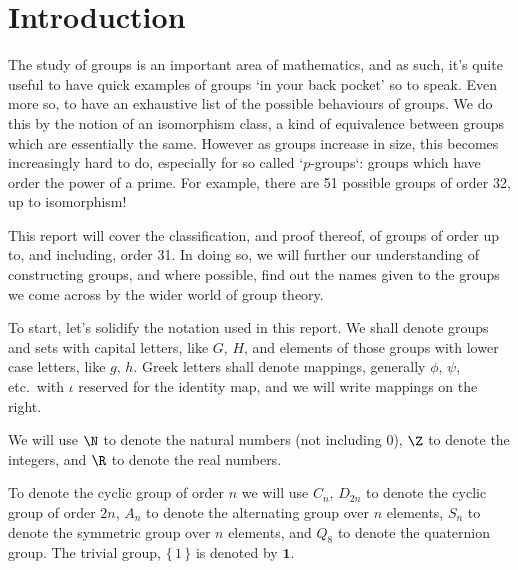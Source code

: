 \section{Introduction}
The study of groups is an important area of mathematics, and as such, it's quite useful to have quick examples of groups
`in your back pocket' so to speak.
Even more so, to have an exhaustive list of the possible behaviours of groups.
We do this by the notion of an isomorphism class, a kind of equivalence between groups which are essentially the same.
However as groups increase in size, this becomes increasingly hard to do, especially for so called `\(p\)-groups`:
groups which have order the power of a prime.
For example, there are 51 possible groups of order 32, up to isomorphism!

This report will cover the classification, and proof thereof, of groups of order up to, and including, order 31.
In doing so, we will further our understanding of constructing groups, and where possible, find out the names given to
the groups we come across by the wider world of group theory.

To start, let's solidify the notation used in this report.
We shall denote groups and sets with capital letters, like \(G\), \(H\), and elements of those groups with lower case
letters, like \(g\), \(h\).
Greek letters shall denote mappings, generally \(\phi\), \(\psi\), etc.\ with \(\iota\) reserved for the identity map,
and we will write mappings on the right.

We will use \(\N\) to denote the natural numbers (not including 0), \(\Z\) to denote the integers, and \(\R\) to denote
the real numbers.

To denote the cyclic group of order \(n\) we will use \(C_n\), \(D_{2n}\) to denote the cyclic group of order \(2n\),
\(A_n\) to denote the alternating group over \(n\) elements, \(S_n\) to denote the symmetric group over \(n\)
elements, and \(Q_8\) to denote the quaternion group.
The trivial group, \(\{\, 1\, \}\) is denoted by \(\bm{1}\).

